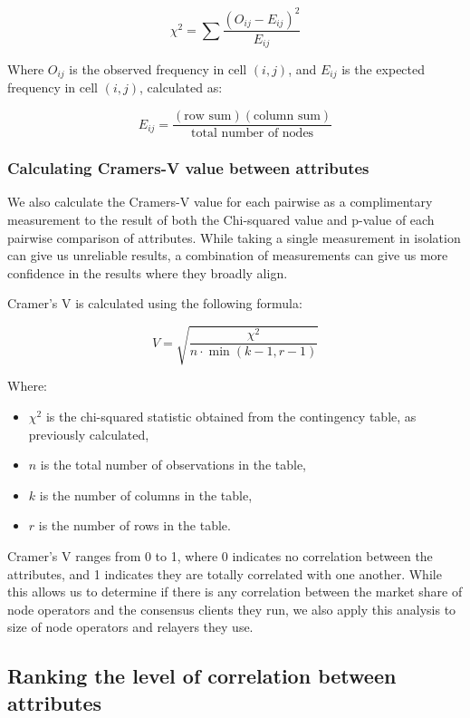 \documentclass[conference]{IEEEtran}
\begin{document}
\[
\chi^2 = \sum \frac{(O_{ij} - E_{ij})^2}{E_{ij}}
\]

Where $O_{ij}$ is the observed frequency in cell $(i, j)$, and $E_{ij}$ is the expected frequency in cell $(i, j)$, calculated as:

\[
E_{ij} = \frac{(\text{row sum})(\text{column sum})}{\text{total number of nodes}}
\]

\subsubsection{Calculating Cramers-V value between attributes}

We also calculate the Cramers-V value \cite{akoglu2018user} for each pairwise as a complimentary measurement to the result of both the Chi-squared value and p-value of each pairwise comparison of attributes.  While taking a single measurement in isolation can give us unreliable results, a combination of measurements can give us more confidence in the results where they broadly align.

Cramer's V is calculated using the following formula:

\[ V = \sqrt{\frac{\chi^2}{n \cdot \min(k-1, r-1)}} \]

Where:
\begin{itemize}
    \item $\chi^2$ is the chi-squared statistic obtained from the contingency table, as previously calculated,
    \item $n$ is the total number of observations in the table,
    \item $k$ is the number of columns in the table,
    \item $r$ is the number of rows in the table.
\end{itemize}

\vspace{8pt}

Cramer's V ranges from 0 to 1, where 0 indicates no correlation between the attributes, and 1 indicates they are totally correlated with one another.  While this allows us to determine if there is any correlation between the market share of node operators and the consensus clients they run, we also apply this analysis to size of node operators and relayers they use.

\subsection{Ranking the level of correlation between attributes}
\end{document}
